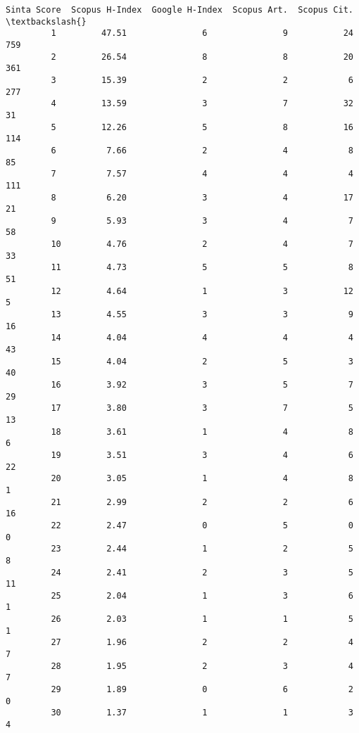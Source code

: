 \documentclass[11pt]{article}
\begin{document}
\begin{Verbatim}[commandchars=\\\{\}]
             Sinta Score  Scopus H-Index  Google H-Index  Scopus Art.  Scopus Cit.  \textbackslash{}
         1         47.51               6               9           24          759   
         2         26.54               8               8           20          361   
         3         15.39               2               2            6          277   
         4         13.59               3               7           32           31   
         5         12.26               5               8           16          114   
         6          7.66               2               4            8           85   
         7          7.57               4               4            4          111   
         8          6.20               3               4           17           21   
         9          5.93               3               4            7           58   
         10         4.76               2               4            7           33   
         11         4.73               5               5            8           51   
         12         4.64               1               3           12            5   
         13         4.55               3               3            9           16   
         14         4.04               4               4            4           43   
         15         4.04               2               5            3           40   
         16         3.92               3               5            7           29   
         17         3.80               3               7            5           13   
         18         3.61               1               4            8            6   
         19         3.51               3               4            6           22   
         20         3.05               1               4            8            1   
         21         2.99               2               2            6           16   
         22         2.47               0               5            0            0   
         23         2.44               1               2            5            8   
         24         2.41               2               3            5           11   
         25         2.04               1               3            6            1   
         26         2.03               1               1            5            1   
         27         1.96               2               2            4            7   
         28         1.95               2               3            4            7   
         29         1.89               0               6            2            0   
         30         1.37               1               1            3            4   

\end{Verbatim}
\end{document}
